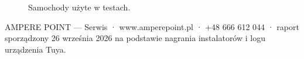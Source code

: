 \documentclass[11pt,a4paper]{article}
\begin{document}
\begin{figure}[H]
\centering
{}\hspace{1.2cm}
\caption{Samochody użyte w testach.}
\label{fig:cars}
\end{figure}

{\color{apmuted}\small AMPERE POINT — Serwis · www.amperepoint.pl · +48 666 612 044 · raport sporządzony 26 września 2026 na podstawie nagrania instalatorów i logu urządzenia Tuya.}
\end{document}
